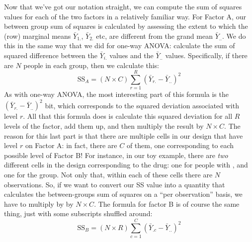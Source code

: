 Now that we've got our notation straight, we can compute the sum of squares values for each of the two factors in a relatively familiar way. For Factor A, our between group sum of squares is calculated by assessing the extent to which the (row) marginal means $\bar{Y}_{1.}$, $\bar{Y}_{2.}$ etc, are different from the grand mean $\bar{Y}_{..}$. We do this in the same way that we did for one-way ANOVA: calculate the sum of squared difference between the $\bar{Y}_{i.}$ values and the $\bar{Y}_{..}$ values. Specifically, if there are $N$ people in each group, then we calculate this:
$$
\mbox{SS}_{A} = (N \times C)  \sum_{r=1}^R  \left( \bar{Y}_{r.} - \bar{Y}_{..} \right)^2
$$
As with one-way ANOVA, the most interesting part of this formula is the $\left( \bar{Y}_{r.} - \bar{Y}_{..} \right)^2$ bit, which corresponds to the squared deviation associated with level $r$. All that this formula does is calculate this squared deviation for all $R$ levels of the factor, add them up, and then multiply the result by $N \times C$. The reason for this last part is that there are multiple cells in our design that have level $r$ on Factor A: in fact, there are $C$ of them, one corresponding to each possible level of Factor B! For instance, in our toy example, there are {\it two} different cells in the design corresponding to the  drug: one for people with , and one for the  group. Not only that, within each of these cells there are $N$ observations. So, if we want to convert our SS value into a quantity that calculates the between-groups sum of squares on a ``per observation'' basis, we have to multiply by by $N \times C$. The formula for factor B is of course the same thing, just with some subscripts shuffled around:
$$
\mbox{SS}_{B} = (N \times R) \sum_{c=1}^C \left( \bar{Y}_{.c} - \bar{Y}_{..} \right)^2
$$

